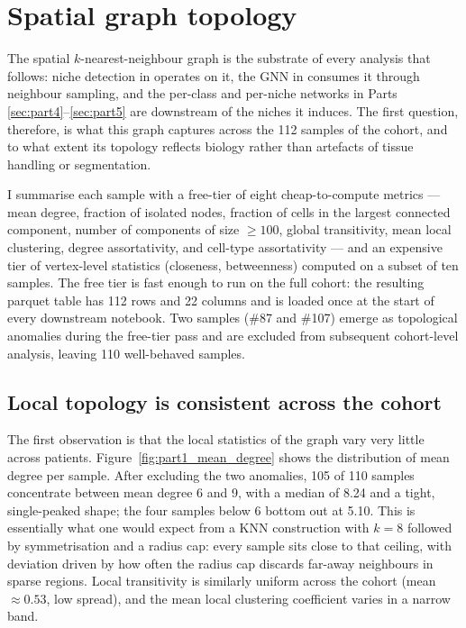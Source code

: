\section{Spatial graph topology}
\label{sec:part1}

The spatial $k$-nearest-neighbour graph is the substrate of every analysis that follows: niche detection in  operates on it, the GNN in  consumes it through neighbour sampling, and the per-class and per-niche networks in Parts \ref{sec:part4}--\ref{sec:part5} are downstream of the niches it induces. The first question, therefore, is what this graph captures across the 112 samples of the cohort, and to what extent its topology reflects biology rather than artefacts of tissue handling or segmentation.

I summarise each sample with a free-tier of eight cheap-to-compute metrics --- mean degree, fraction of isolated nodes, fraction of cells in the largest connected component, number of components of size $\geq 100$, global transitivity, mean local clustering, degree assortativity, and cell-type assortativity --- and an expensive tier of vertex-level statistics (closeness, betweenness) computed on a subset of ten samples. The free tier is fast enough to run on the full cohort: the resulting parquet table has 112 rows and 22 columns and is loaded once at the start of every downstream notebook. Two samples (\#87 and \#107) emerge as topological anomalies during the free-tier pass and are excluded from subsequent cohort-level analysis, leaving 110 well-behaved samples.

\subsection*{Local topology is consistent across the cohort}

The first observation is that the local statistics of the graph vary very little across patients. Figure~\ref{fig:part1_mean_degree} shows the distribution of mean degree per sample. After excluding the two anomalies, 105 of 110 samples concentrate between mean degree 6 and 9, with a median of 8.24 and a tight, single-peaked shape; the four samples below 6 bottom out at 5.10. This is essentially what one would expect from a KNN construction with $k = 8$ followed by symmetrisation and a radius cap: every sample sits close to that ceiling, with deviation driven by how often the radius cap discards far-away neighbours in sparse regions. Local transitivity is similarly uniform across the cohort (mean $\approx 0.53$, low spread), and the mean local clustering coefficient varies in a narrow band.

